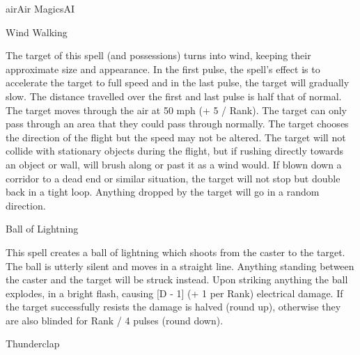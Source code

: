 \begin{College}[2.1]{air}{Air Magics}{AI}
\begin{spell}[S-17]{Wind Walking}
\begin{effects}
The target of this spell (and possessions) turns into wind, keeping
their approximate size and appearance. In the first pulse, the spell’s
effect is to accelerate the target to full speed and in the last
pulse, the target will gradually slow.  The distance travelled over
the first and last pulse is half that of normal. The target moves
through the air at 50 mph (+ 5 / Rank).  The target can only pass
through an area that they could pass through normally.  The target
chooses the direction of the flight but the speed may not be altered.
The target will not collide with stationary objects during the flight,
but if rushing directly towards an object or wall, will brush along or
past it as a wind would.  If blown down a corridor to a dead end or
similar situation, the target will not stop but double back in a tight
loop.  Anything dropped by the target will go in a random direction.
\end{effects}
\end{spell}

\begin{spell}[S-18]{Ball of Lightning}

\begin{effects}
This spell creates a ball of lightning which shoots from the caster to
the target.  The ball is utterly silent and moves in a straight
line. Anything standing between the caster and the target will be
struck instead.  Upon striking anything the ball explodes, in a bright
flash, causing [D - 1] (+ 1 per Rank) electrical damage.  If the
target successfully resists the damage is halved (round up), otherwise
they are also blinded for Rank / 4 pulses (round down).
\end{effects}
\end{spell}

\begin{spell}[S-19]{Thunderclap}


\end{spell}
\end{College}
